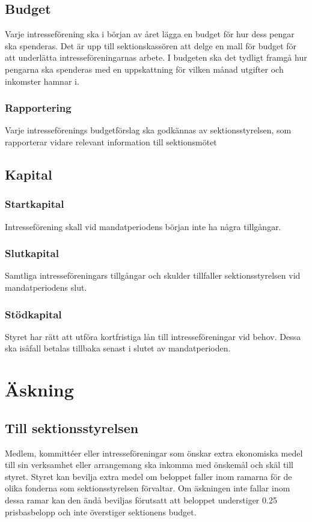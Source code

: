 \documentclass[a4paper]{dtek}
\newcommand{\prisbasbelopp}[1]{
    #1 prisbasbelopp
    \ifdef{\nuvarandeprisbasbelopp}{
        \marginpar{
            \small{ \textbf{\roundandprint{\xintiexpr#1 * \nuvarandeprisbasbelopp\relax}kr}}
        }
    }{}
}
\begin{document}
\subsection{Budget}\label{IntresseBudget}
Varje intresseförening ska i början av året lägga en budget för hur dess pengar ska spenderas.
Det är upp till sektionskassören att delge en mall för budget för att underlätta intresseföreningarnas arbete.
I budgeten ska det tydligt framgå hur pengarna ska spenderas med en uppskattning för vilken månad utgifter och inkomster hamnar i.

\subsubsection{Rapportering}
Varje intresseförenings budgetförslag ska godkännas av sektionsstyrelsen, som rapporterar vidare relevant information till sektionsmötet

\subsection{Kapital}
\subsubsection{Startkapital}
Intresseförening skall vid mandatperiodens början inte ha några tillgångar.
\subsubsection{Slutkapital}
Samtliga intresseföreningars tillgångar och skulder tillfaller sektionsstyrelsen vid mandatperiodens slut.
\subsubsection{Stödkapital}
Styret har rätt att utföra kortfristiga lån till intresseföreningar vid behov.
Dessa ska isåfall betalas tillbaka senast i slutet av mandatperioden.

\section{Äskning}
\subsection{Till sektionsstyrelsen}
Medlem, kommittéer eller intresseföreningar som önskar extra ekonomiska medel till sin verksamhet eller arrangemang ska inkomma med önskemål och skäl till styret.
Styret kan bevilja extra medel om beloppet faller inom ramarna för de olika fonderna som sektionsstyrelsen förvaltar. Om äskningen inte fallar inom dessa ramar kan den ändå beviljas förutsatt att beloppet understiger \prisbasbelopp{0.25} och inte överstiger sektionens budget.
\end{document}

